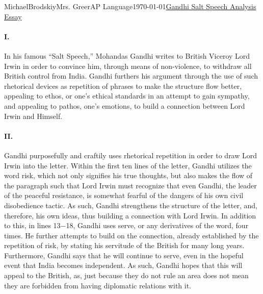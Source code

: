\documentclass[12pt,letterpaper]{article}
\begin{document}
\begin{mla}{Michael}{Brodskiy}{Mrs. Greer}{AP Language}{\today}{\underline{Gandhi Salt Speech Analysis Essay}} 

  \begin{justifying}

    \paragraph{I.} In his famous ``Salt Speech,'' Mohandas Gandhi writes to British Viceroy Lord Irwin in order to convince him, through means of non-violence, to withdraw all British control from India. Gandhi furthers his argument through the use of such rhetorical devices as repetition of phrases to make the structure flow better, appealing to ethos, or one's ethical standards in an attempt to gain sympathy, and appealing to pathos, one's emotions, to build a connection between Lord Irwin and Himself.

    \paragraph{II.} Gandhi purposefully and craftily uses rhetorical repetition in order to draw Lord Irwin into the letter. Within the first ten lines of the letter, Gandhi utilizes the word risk, which not only signifies his true thoughts, but also makes the flow of the paragraph such that Lord Irwin must recognize that even Gandhi, the leader of the peaceful resistance, is somewhat fearful of the dangers of his own civil disobedience tactic. As such, Gandhi strengthens the structure of the letter, and, therefore, his own ideas, thus building a connection with Lord Irwin. In addition to this, in lines 13$-$18, Gandhi uses serve, or any derivatives of the word, four times. He further attempts to build on the connection, already established by the repetition of risk, by stating his servitude of the British for many long years. Furthermore, Gandhi says that he will continue to serve, even in the hopeful event that India becomes independent. As such, Gandhi hopes that this will appeal to the British, as, just because they do not rule an area does not mean they are forbidden from having diplomatic relations with it. 


\end{justifying}
\end{mla}
\end{document}
